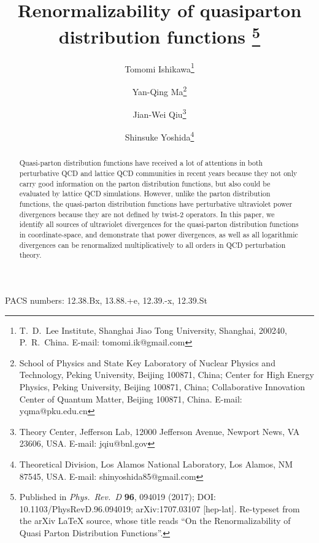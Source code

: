 \documentclass[11pt]{article}
\title{Renormalizability of quasiparton distribution functions%
\thanks{Published in \emph{Phys.\ Rev.\ D} \textbf{96}, 094019 (2017);
DOI: 10.1103/PhysRevD.96.094019; arXiv:1707.03107 [hep-lat].  Re-typeset
from the arXiv LaTeX source, whose title reads ``On the Renormalizability
of Quasi Parton Distribution Functions''.}}
\author{Tomomi Ishikawa\thanks{T.~D.~Lee Institute, Shanghai Jiao Tong University,
Shanghai, 200240, P.~R.~China. E-mail: tomomi.ik@gmail.com}
\and Yan-Qing Ma\thanks{School of Physics and State Key Laboratory of Nuclear Physics and
Technology, Peking University, Beijing 100871, China; Center for High Energy Physics,
Peking University, Beijing 100871, China; Collaborative Innovation Center of Quantum Matter,
Beijing 100871, China. E-mail: yqma@pku.edu.cn}
\and Jian-Wei Qiu\thanks{Theory Center, Jefferson Lab, 12000 Jefferson Avenue,
Newport News, VA 23606, USA. E-mail: jqiu@bnl.gov}
\and Shinsuke Yoshida\thanks{Theoretical Division, Los Alamos National Laboratory,
Los Alamos, NM 87545, USA. E-mail: shinyoshida85@gmail.com}}
\date{}
\begin{document}
\maketitle

\begin{abstract}
Quasi-parton distribution functions have received a lot of attentions in both perturbative QCD and lattice QCD communities in recent years because they not only carry good information on the parton distribution functions, but also could be evaluated by lattice QCD simulations.  However, unlike the parton distribution functions, the quasi-parton distribution functions have perturbative ultraviolet power divergences because they are not defined by twist-2 operators.  In this paper, we identify all sources of ultraviolet divergences for the quasi-parton distribution functions in coordinate-space, and demonstrate that power divergences, as well as all logarithmic divergences can be renormalized multiplicatively to all orders in QCD perturbation theory.
\end{abstract}

\noindent PACS numbers: 12.38.Bx, 13.88.+e, 12.39.-x, 12.39.St

\bigskip








\end{document}
